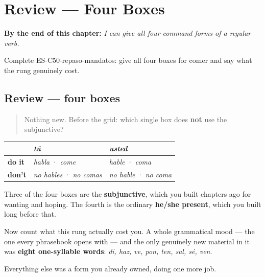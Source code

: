 
\chapter{Review --- Four Boxes}
\label{ch:review-commands}

\begin{chapteropening}
\textbf{By the end of this chapter:} \emph{I can give all four command forms of a regular verb.}

Complete ES-C50-repaso-mandatos: give all four boxes for comer and say what the rung genuinely cost.
\end{chapteropening}

\section[Practice]{Review — four boxes}

\label{lesson:ES-C50-repaso-mandatos}



\begin{quote}
Nothing new. Before the grid: which single box does \textbf{not} use the subjunctive?
\end{quote}

\begin{grammarlens}[title={What you've built}]
\noindent
\begin{tabularx}{\linewidth}{@{}>{\raggedright\arraybackslash}X>{\raggedright\arraybackslash}X>{\raggedright\arraybackslash}X@{}}
\toprule
\textbf{} & \textbf{\emph{tú}} & \textbf{\emph{usted}} \\
\midrule
\textbf{do it} & \emph{habla} · \emph{come} & \emph{hable} · \emph{coma} \\
\textbf{don't} & \emph{no hables} · \emph{no comas} & \emph{no hable} · \emph{no coma} \\
\bottomrule
\end{tabularx}

Three of the four boxes are the \textbf{subjunctive}, which you built chapters ago for wanting and hoping. The fourth is the ordinary \textbf{he/she present}, which you built long before that.

Now count what this rung actually cost you. A whole grammatical mood — the one every phrasebook opens with — and the only genuinely new material in it was \textbf{eight one-syllable words}: \emph{di, haz, ve, pon, ten, sal, sé, ven}.

Everything else was a form you already owned, doing one more job.
\end{grammarlens}

